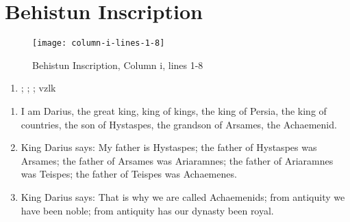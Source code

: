 \section{Behistun Inscription}

\begin{figure}[H]
    \texttt{[image: column-i-lines-1-8]}
    \caption{Behistun Inscription, Column i, lines 1-8\cite{BehistunT01}}
\end{figure}

\begin{enumerate}
    \item {\oldpersian ;} {\oldpersian ;}   {\oldpersian ;} {\oldpersian vzlk}
\end{enumerate}

\begin{enumerate}
    \item I am Darius, the great king, king of kings, the king of Persia, the king of countries, the son of Hystaspes,
         the grandson of Arsames, the Achaemenid.
    \item King Darius says: My father is Hystaspes; the father of Hystaspes was Arsames; the father of Arsames was
          Ariaramnes; the father of Ariaramnes was Teispes; the father of Teispes was Achaemenes.
    \item King Darius says: That is why we are called Achaemenids; from antiquity we have been noble; from antiquity
          has our dynasty been royal.
\end{enumerate}

